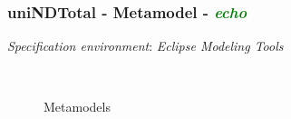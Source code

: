 \documentclass{beamer}
\begin{document}
\begin{frame}
\frametitle{uniNDTotal - \textbf{Metamodel} - \textbf{\textit{\textcolor{green}{echo}}}}

\textit{Specification environment}: \textit{Eclipse Modeling Tools}

\begin{figure}[ht]
    \centering
    \mbox{\qquad\qquad
          }
    \caption{Metamodels}
    \label{fig:Meta}
\end{figure}

\end{frame}
\end{document}
